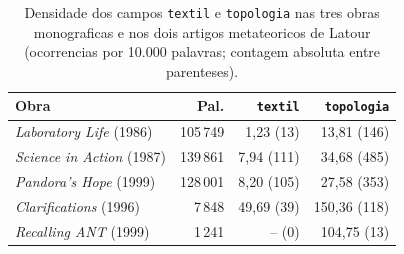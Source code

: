 \begin{table}[htbp]
\centering
\caption[Campos textil e topologia, 5 obras de Latour]{Densidade dos campos \texttt{textil} e \texttt{topologia} nas tres obras monograficas e nos dois artigos metateoricos de Latour (ocorrencias por 10.000 palavras; contagem absoluta entre parenteses).}
\label{tab:textil-topologico-5-obras}
\small
\begin{tabular}{lrrr}
\toprule
Obra & Pal. & \texttt{textil} & \texttt{topologia} \\
\midrule
\emph{Laboratory Life} (1986) & 105\,749 & 1{,}23 (13) & 13{,}81 (146) \\
\emph{Science in Action} (1987) & 139\,861 & 7{,}94 (111) & 34{,}68 (485) \\
\emph{Pandora's Hope} (1999) & 128\,001 & 8{,}20 (105) & 27{,}58 (353) \\
\emph{Clarifications} (1996) & 7\,848 & 49{,}69 (39) & 150{,}36 (118) \\
\emph{Recalling ANT} (1999) & 1\,241 & -- (0) & 104{,}75 (13) \\
\bottomrule
\end{tabular}
\end{table}
